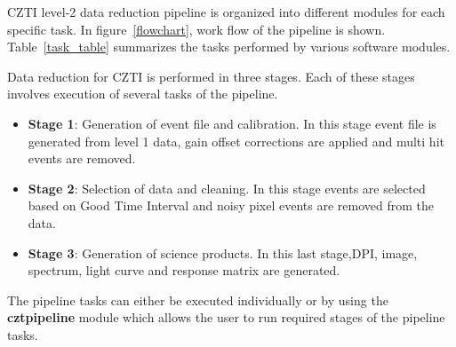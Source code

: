 \documentclass[11pt,oneside,a4paper]{article}
\begin{document}
CZTI level-2 data reduction pipeline is organized into different modules for each specific 
task. In figure~\ref{flowchart}, work flow of the pipeline is shown. Table~\ref{task_table} 
summarizes the tasks performed by various software modules.  

Data reduction for CZTI is performed in three stages. Each of these stages involves 
execution of several tasks of the pipeline. 

\begin{itemize}

    \item{{\bf Stage 1}: Generation of event file and calibration. In this stage event file is generated
from level 1 data, gain offset corrections are applied and multi hit events are removed.}

\item{{\bf Stage 2}: Selection of data and cleaning. In this stage events are selected based on Good
Time Interval and noisy pixel events are removed from the data.
}

\item{{\bf Stage 3}: Generation of science products. In this last stage,DPI, image, spectrum, light curve and response
        matrix are generated.
}
\end{itemize}

The pipeline tasks can either be executed individually or by using the {\bf cztpipeline} module 
which allows the user to run required stages of the pipeline tasks.
\end{document}
